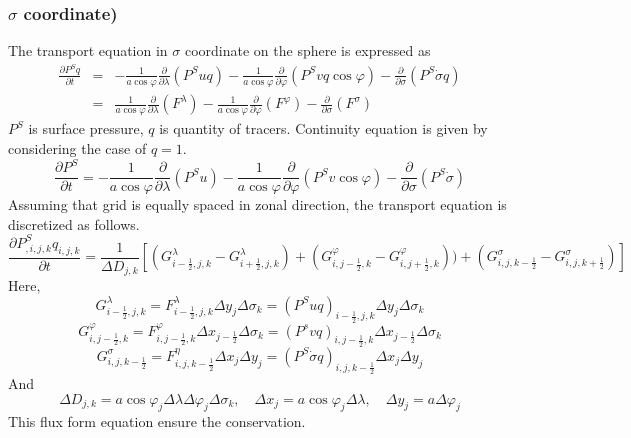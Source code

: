 \documentclass{article}
\begin{document}
  \subsubsection{$\sigma$ coordinate)}
The transport equation in $\sigma$ coordinate on the sphere is expressed as
\begin{eqnarray}
  \label{b1}
  \frac{\partial P^{S} q}{\partial t} &=& - \frac{1}{a \cos \varphi} \frac{\partial}{\partial \lambda}(P^{S} uq)- \frac{1}{a \cos \varphi} \frac{\partial}{\partial \varphi}(P^{S} vq \cos \varphi)- \frac{\partial}{\partial \sigma} (P^{S} \dot{\sigma} q)\\
  &=& \frac{1}{a \cos \varphi} \frac{\partial}{\partial \lambda}(F^{\lambda})- \frac{1}{a \cos \varphi} \frac{\partial}{\partial \varphi}(F^{\varphi})- \frac{\partial}{\partial \sigma} (F^{\sigma})
\end{eqnarray}
$P^{S}$ is surface pressure, $q$ is quantity of tracers.
Continuity equation is given by considering the case of $q=1$.
\begin{equation}
  \frac{\partial P^{S}}{\partial t} = - \frac{1}{a \cos \varphi} \frac{\partial}{\partial \lambda}(P^{S}u)- \frac{1}{a \cos \varphi} \frac{\partial}{\partial \varphi}(P^{S}v \cos \varphi)- \frac{\partial}{\partial \sigma} (P^{S} \dot{\sigma})
\end{equation}
Assuming that grid is equally spaced in zonal direction, the transport equation is discretized as follows.
\begin{equation}
\label{a1}
  \frac{\partial P^{S}_{,i,j,k} q_{i,j,k}}{\partial t}=\frac{1}{\Delta D_{j,k}}[(G^{\lambda}_{i-\frac{1}{2},j,k}-G^{\lambda}_{i+\frac{1}{2},j,k})+(G^{\varphi}_{i,j-\frac{1}{2},k}-G^{\varphi}_{i,j+\frac{1}{2},k}))+(G^{\sigma}_{i,j,k-\frac{1}{2}}-G^{\sigma}_{i,j,k+\frac{1}{2}})]
\end{equation}
Here,
\begin{equation}
  G^{\lambda}_{i-\frac{1}{2},j,k}=F^{\lambda}_{i-\frac{1}{2},j,k} \Delta y_{j} \Delta \sigma_{k}=(P^{S}uq)_{i-\frac{1}{2},j,k} \Delta y_{j} \Delta \sigma_{k}
\end{equation}
\begin{equation}
  G^{\varphi}_{i,j-\frac{1}{2},k}=F^{\varphi}_{i,j-\frac{1}{2},k} \Delta x_{j-\frac{1}{2}} \Delta \sigma_{k}=(P^{s}vq)_{i,j-\frac{1}{2},k} \Delta x_{j-\frac{1}{2}} \Delta \sigma_{k}
\end{equation}
\begin{equation}
  G^{\sigma}_{i,j,k-\frac{1}{2}}=F^{\eta}_{i,j,k-\frac{1}{2}} \Delta x_{j} \Delta y_{j}=(P^{S} \dot{\sigma} q)_{i,j,k-\frac{1}{2}} \Delta x_{j} \Delta y_{j}
\end{equation}
And
\begin{equation}
  \Delta D_{j,k}=a \cos \varphi_{j} \Delta \lambda \Delta \varphi_{j} \Delta \sigma_{k},\quad \Delta x_{j}=a \cos \varphi_{j} \Delta \lambda,\quad \Delta y_{j}=a \Delta \varphi_{j}
\end{equation}
This flux form equation ensure the conservation.
\end{document}
